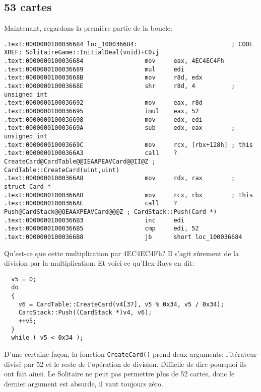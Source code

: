 \subsection{53 cartes}

\renewcommand{\CURPATH}{examples/solitaire/53}

Maintenant, regardons la première partie de la boucle:

\begin{lstlisting}
.text:0000000100036684 loc_100036684:                          ; CODE XREF: SolitaireGame::InitialDeal(void)+C0↓j
.text:0000000100036684                 mov     eax, 4EC4EC4Fh
.text:0000000100036689                 mul     edi
.text:000000010003668B                 mov     r8d, edx
.text:000000010003668E                 shr     r8d, 4          ; unsigned int
.text:0000000100036692                 mov     eax, r8d
.text:0000000100036695                 imul    eax, 52
.text:0000000100036698                 mov     edx, edi
.text:000000010003669A                 sub     edx, eax        ; unsigned int
.text:000000010003669C                 mov     rcx, [rbx+128h] ; this
.text:00000001000366A3                 call    ?CreateCard@CardTable@@IEAAPEAVCard@@II@Z ; CardTable::CreateCard(uint,uint)
.text:00000001000366A8                 mov     rdx, rax        ; struct Card *
.text:00000001000366AB                 mov     rcx, rbx        ; this
.text:00000001000366AE                 call    ?Push@CardStack@@QEAAXPEAVCard@@@Z ; CardStack::Push(Card *)
.text:00000001000366B3                 inc     edi
.text:00000001000366B5                 cmp     edi, 52
.text:00000001000366B8                 jb      short loc_100036684
\end{lstlisting}

Qu'est-ce que cette multiplication par 4EC4EC4Fh? Il s'agit sûrement de la division
par la multiplication.
Et voici ce qu'Hex-Rays en dit:

\begin{lstlisting}
  v5 = 0;
  do
  {
    v6 = CardTable::CreateCard(v4[37], v5 % 0x34, v5 / 0x34);
    CardStack::Push((CardStack *)v4, v6);
    ++v5;
  }
  while ( v5 < 0x34 );
\end{lstlisting}

D'une certaine façon, la fonction \verb|CreateCard()| prend deux arguments:
l'itérateur divisé par 52 et le reste de l'opération de division.
Difficile de dire pourquoi ils ont fait ainsi.
Le Solitaire ne peut pas permettre plus de 52 cartes, donc le dernier argument
est absurde, il vaut toujours zéro.

